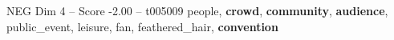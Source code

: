 \begin{textsample}{NEG Dim 4 – Score -2.00 – t005009}  \label{ex:f4_neg_036}
people, \textbf{crowd}, \textbf{community}, \textbf{audience}, public\_event, leisure, fan, feathered\_hair, \textbf{convention}

\end{textsample}

